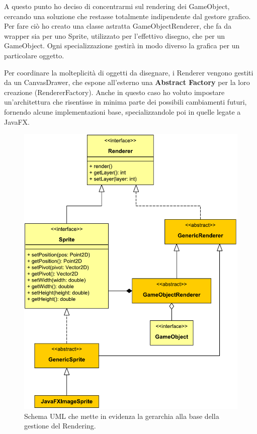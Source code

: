 \documentclass[a4paper,12pt]{report}
\begin{document}
A questo punto ho deciso di concentrarmi sul rendering dei GameObject, cercando una soluzione che restasse totalmente indipendente dal gestore grafico.
Per fare ciò ho creato una classe astratta GameObjectRenderer, che fa da wrapper sia per uno Sprite, utilizzato per l'effettivo disegno, che per un GameObject.
Ogni specializzazione gestirà in modo diverso la grafica per un particolare oggetto.

Per coordinare la molteplicità di oggetti da disegnare, i Renderer vengono gestiti da un CanvasDrawer, che espone all'esterno una \textbf{Abstract Factory} per la loro creazione (RendererFactory).
Anche in questo caso ho voluto impostare un'architettura che risentisse in minima parte dei possibili cambiamenti futuri, fornendo alcune implementazioni base, specializzandole poi in quelle legate a JavaFX.

\begin{figure}[H]
\includegraphics[width=\linewidth]{img/renderers}
\caption{Schema UML che mette in evidenza la gerarchia alla base della gestione del Rendering.}
\label{img:renderers}
\end{figure}
\end{document}
